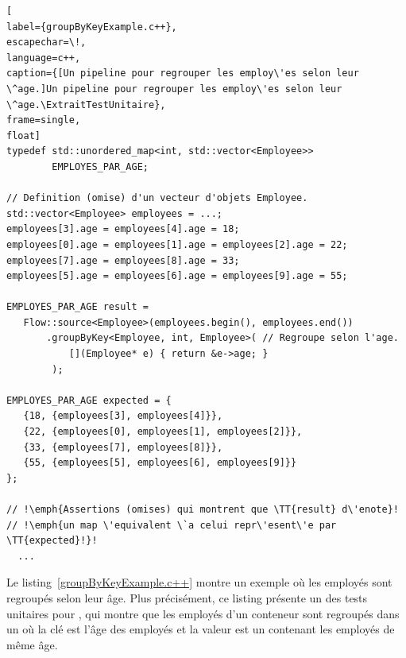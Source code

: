 \begin{lstlisting}[
label={groupByKeyExample.c++},
escapechar=\!,
language=c++,
caption={[Un pipeline pour regrouper les employ\'es selon leur \^age.]Un pipeline pour regrouper les employ\'es selon leur \^age.\ExtraitTestUnitaire},
frame=single,
float]
typedef std::unordered_map<int, std::vector<Employee>> 
        EMPLOYES_PAR_AGE;

// Definition (omise) d'un vecteur d'objets Employee.
std::vector<Employee> employees = ...; 
employees[3].age = employees[4].age = 18;
employees[0].age = employees[1].age = employees[2].age = 22;
employees[7].age = employees[8].age = 33;
employees[5].age = employees[6].age = employees[9].age = 55;

EMPLOYES_PAR_AGE result = 
   Flow::source<Employee>(employees.begin(), employees.end())
       .groupByKey<Employee, int, Employee>( // Regroupe selon l'age.
           [](Employee* e) { return &e->age; } 
        );
    
EMPLOYES_PAR_AGE expected = {
   {18, {employees[3], employees[4]}},
   {22, {employees[0], employees[1], employees[2]}},
   {33, {employees[7], employees[8]}},
   {55, {employees[5], employees[6], employees[9]}}
};

// !\emph{Assertions (omises) qui montrent que \TT{result} d\'enote}!
// !\emph{un map \'equivalent \`a celui repr\'esent\'e par \TT{expected}!}!
  ...
\end{lstlisting}




Le listing~\ref{groupByKeyExample.c++} montre un exemple o\`u les employ\'es sont regroup\'es selon leur \^age. Plus pr\'ecis\'ement, ce listing pr\'esente un des tests unitaires pour , qui montre que les employ\'es d'un conteneur sont regroup\'es dans un  o\`u la cl\'e est l'\^age des employ\'es et la valeur est un  contenant les employ\'es de m\^eme \^age.
%

